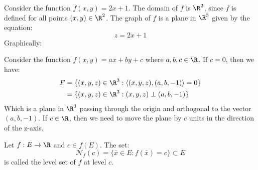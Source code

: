 \begin{eg}
    Consider the function $f(x,y) = 2x + 1$. The domain of $f$ is $\R^2$, since $f$ is defined for all points $(x,y) \in \R^2$. The graph of $f$ is a plane in $\R^3$ given by the equation:
    \[
        z = 2x + 1
    \]
    Graphically:
    \begin{center}
    \end{center}
\end{eg}

\begin{eg}
    Consider the function $f(x,y) = ax + by + c$ where $a,b,c \in \R$. If $c = 0$, then we have:
    \begin{align*}
        F & = \{(x,y,z) \in \R^3 : \langle(x,y,z),(a,b,-1)\rangle = 0 \} \\
          & = \{(x,y,z) \in \R^3 : (x,y,z) \perp (a,b,-1)\}
    \end{align*}
    Which is a plane in $\R^3$ passing through the origin and orthogonal to the vector $(a,b,-1)$. If $c \in \R$, then we need to move the plane by $c$ units in the direction of the z-axis.
\end{eg}

\begin{definition}
    Let $f: E \to \R$ and $c \in f(E)$. The set:
    \[
        \mathcal{N}_f(c) = \{\bar{x} \in E : f(\bar{x}) = c\} \subset E
    \]
    is called the level set of $f$ at level $c$.
\end{definition}


